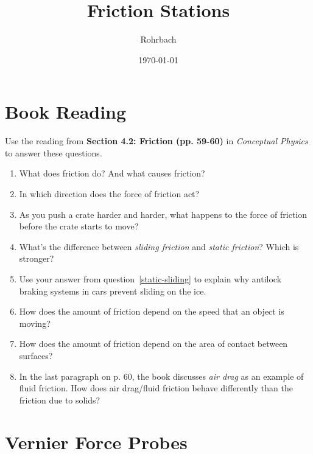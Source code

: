 \documentclass[10pt]{exam}
\title{Friction Stations}
\author{Rohrbach}
\date{\today}
\begin{document}
\maketitle


\section{Book Reading} \label{book}

Use the reading from {\bf Section 4.2: Friction (pp. 59-60)} in \emph{Conceptual Physics} to answer these questions.

\begin{enumerate}
  \item 
    What does friction do?  And what causes friction?
    \vs

  \item 
    In which direction does the force of friction act?
    \vs

  \item 
    As you push a crate harder and harder, what happens to the force of friction before the crate starts to move?
    \vs

  \item
    What's the difference between \emph{sliding friction} and \emph{static friction}?  Which is stronger? \label{static-sliding}
    \vs

\pagebreak

  \item
    Use your answer from question~\ref{static-sliding} to explain why antilock braking systems in cars prevent sliding on the ice.
    \vs

  \item
    How does the amount of friction depend on the speed that an object is moving?
    \vs

  \item
    How does the amount of friction depend on the area of contact between surfaces?
    \vs 

  \item 
    In the last paragraph on p. 60, the book discusses \emph{air drag} as an example of fluid friction.  How does air drag/fluid friction behave differently than the friction due to solids?
    \vs 
  
\end{enumerate}


\pagebreak
\section{Vernier Force Probes} \label{vernier}
\end{document}
